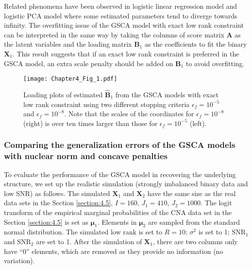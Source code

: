 Related phenomena have been observed in logistic linear regression model and logistic PCA model \cite{de2006principal, song2017principal} where some estimated parameters tend to diverge towards infinity. The overfitting issue of the GSCA model with exact low rank constraint can be interpreted in the same way by taking the columns of score matrix $\mathbf{A}$ as the latent variables and the loading matrix $\mathbf{B}_1$ as the coefficients to fit the binary $\mathbf{X}_1$. This result suggests that if an exact low rank constraint is preferred in the GSCA model, an extra scale penalty should be added on $\mathbf{B}_1$ to avoid overfitting.
\begin{figure}[htbp]
    \centering
    \texttt{[image: Chapter4\_Fig\_1.pdf]}
    \caption{Loading plots of estimated $\hat{\mathbf{B}}_1$ from the GSCA models with exact low rank constraint using two different stopping criteria $\epsilon_f =10^{-5}$ and $\epsilon_f=10^{-8}$. Note that the scales of the coordinates for $\epsilon_f = 10^{-8}$ (right) is over ten times larger than those for $\epsilon_f = 10^{-5}$ (left).}
    \label{chapter4_fig:1}
\end{figure}

\subsubsection{Comparing the generalization errors of the GSCA models with nuclear norm and concave penalties}
To evaluate the performance of the GSCA model in recovering the underlying structure, we set up the realistic simulation (strongly imbalanced binary data and low SNR) as follows. The simulated $\mathbf{X}_1$ and $\mathbf{X}_2$ have the same size as the real data sets in the Section \ref{section:4.5}, $I=160$, $J_1=410$, $J_2 = 1000$. The logit transform of the empirical marginal probabilities of the CNA data set in the Section \ref{section:4.5} is set as $\bm{\mu}_1$. Elements in $\bm{\mu}_2$ are sampled from the standard normal distribution. The simulated low rank is set to $R=10$; $\sigma^2$ is set to 1; $\text{SNR}_1$ and $\text{SNR}_2$ are set to 1. After the simulation of $\mathbf{X}_1$, there are two columns only have ``0'' elements, which are removed as they provide no information (no variation).

